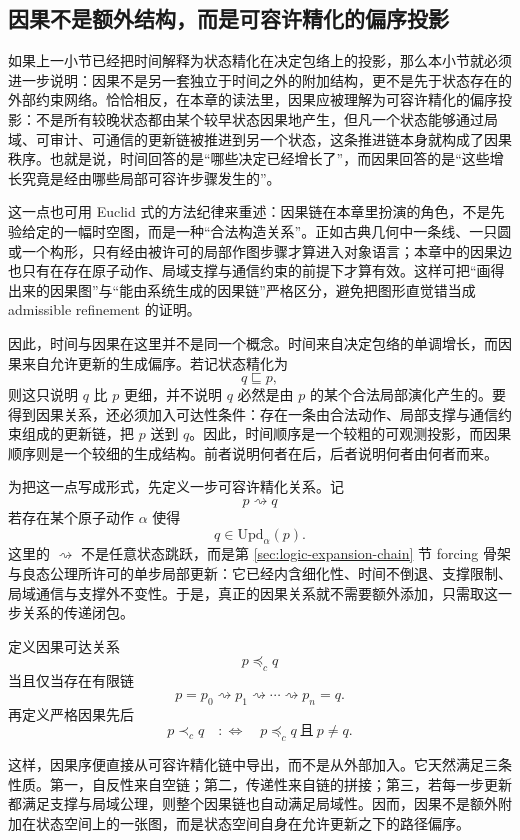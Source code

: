 \subsection{因果不是额外结构，而是可容许精化的偏序投影}\label{subsec:physical-spacetime-skeleton-nonretroactive-resolution}

如果上一小节已经把时间解释为状态精化在决定包络上的投影，那么本小节就必须进一步说明：因果不是另一套独立于时间之外的附加结构，更不是先于状态存在的外部约束网络。恰恰相反，在本章的读法里，因果应被理解为可容许精化的偏序投影：不是所有较晚状态都由某个较早状态因果地产生，但凡一个状态能够通过局域、可审计、可通信的更新链被推进到另一个状态，这条推进链本身就构成了因果秩序。也就是说，时间回答的是“哪些决定已经增长了”，而因果回答的是“这些增长究竟是经由哪些局部可容许步骤发生的”。

这一点也可用 Euclid 式的方法纪律来重述：因果链在本章里扮演的角色，不是先验给定的一幅时空图，而是一种“合法构造关系”。正如古典几何中一条线、一只圆或一个构形，只有经由被许可的局部作图步骤才算进入对象语言；本章中的因果边也只有在存在原子动作、局域支撑与通信约束的前提下才算有效。这样可把“画得出来的因果图”与“能由系统生成的因果链”严格区分，避免把图形直觉错当成 admissible refinement 的证明。

因此，时间与因果在这里并不是同一个概念。时间来自决定包络的单调增长，而因果来自允许更新的生成偏序。若记状态精化为
\[
q\sqsubseteq p,
\]
则这只说明 \(q\) 比 \(p\) 更细，并不说明 \(q\) 必然是由 \(p\) 的某个合法局部演化产生的。要得到因果关系，还必须加入可达性条件：存在一条由合法动作、局部支撑与通信约束组成的更新链，把 \(p\) 送到 \(q\)。因此，时间顺序是一个较粗的可观测投影，而因果顺序则是一个较细的生成结构。前者说明何者在后，后者说明何者由何者而来。

为把这一点写成形式，先定义一步可容许精化关系。记
\[
p \rightsquigarrow q
\]
若存在某个原子动作 \(\alpha\) 使得
\[
q\in \mathrm{Upd}_\alpha(p).
\]
这里的 \(\rightsquigarrow\) 不是任意状态跳跃，而是第 \ref{sec:logic-expansion-chain} 节 forcing 骨架与良态公理所许可的单步局部更新：它已经内含细化性、时间不倒退、支撑限制、局域通信与支撑外不变性。于是，真正的因果关系就不需要额外添加，只需取这一步关系的传递闭包。

定义因果可达关系
\[
p\preceq_c q
\]
当且仅当存在有限链
\[
p=p_0 \rightsquigarrow p_1 \rightsquigarrow \cdots \rightsquigarrow p_n=q.
\]
再定义严格因果先后
\[
p\prec_c q
\quad:\Longleftrightarrow\quad
p\preceq_c q\ \text{且}\ p\neq q.
\]

这样，因果序便直接从可容许精化链中导出，而不是从外部加入。它天然满足三条性质。第一，自反性来自空链；第二，传递性来自链的拼接；第三，若每一步更新都满足支撑与局域公理，则整个因果链也自动满足局域性。因而，因果不是额外附加在状态空间上的一张图，而是状态空间自身在允许更新之下的路径偏序。

